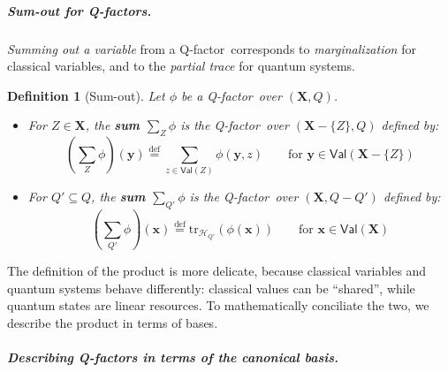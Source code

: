 \documentclass[10pt,a4paper]{article}
\newcommand*{\eg}{\emph{e.g.}\xspace}
\newcommand*{\definitive}[1]{\textbf{#1}}
\newcommand*{\defeq}{\stackrel{\text{def}}{=}}
\newcommand*{\difset}{\mathrel{-}}
\newcommand*{\setofrv}[1]{\mathsf{Val}(#1)}
\newcommand{\bX}{\mathbf X}
\newcommand{\bx}{{\mathbf x}}
\newcommand{\by}{{\mathbf y}}
\newcommand{\ptr}[1]{\mathrm{tr}_{#1}}
\newcommand{\HH}{\mathcal{H}}
\newcommand{\reg}{Q}
\newcommand{\qreg}{\reg}
\newcommand*{\someqfact}{\phi}
\newcommand*{\qfactor}{Q-factor}
\newtheorem{definition}[theorem]{Definition}
\begin{document}
\subparagraph*{Sum-out for \qfactor s.}
\emph{Summing out a variable} from a \qfactor\ corresponds to \emph{marginalization} for classical variables, and to the \emph{partial trace} for quantum systems.
\begin{definition}[Sum-out]
\label{def:sum}
Let $\someqfact$ be a \qfactor\ over $(\bX,\qreg)$. 
\begin{itemize}
\item
For $Z \in \bX$, the \definitive{sum $\sum_{Z} \someqfact $} is the \qfactor\ over $(\bX \difset\{Z\},\qreg )$ defined by:
\begin{equation*}
\left(\sum_Z \someqfact\right) (\by) \defeq \sum_{z\in\setofrv{Z}} \someqfact (\by,z)
\qquad
\text{for $\by \in \setofrv{\bX \difset\{Z\}}$}
\end{equation*}
\item
For $\qreg' \subseteq \qreg $, the \definitive{sum $\sum_{\qreg'} \someqfact $} is the \qfactor\ over $(\bX ,\qreg \difset\qreg')$ defined by:
\begin{equation*}
\left(\sum_{\qreg'} \someqfact\right) (\bx) \defeq \ptr{\HH_{\qreg'}}\left(\someqfact (\bx)\right)
\qquad
\text{for $\bx \in \setofrv{\bX}$}
\end{equation*}
\end{itemize}
\end{definition}

The definition of the product is more delicate, because classical variables and quantum systems behave differently: classical values can be ``shared'', while quantum states are linear resources.
To mathematically conciliate the two, we describe the product in terms of bases.

\subparagraph{Describing \qfactor s in terms of the canonical basis.}
\end{document}
